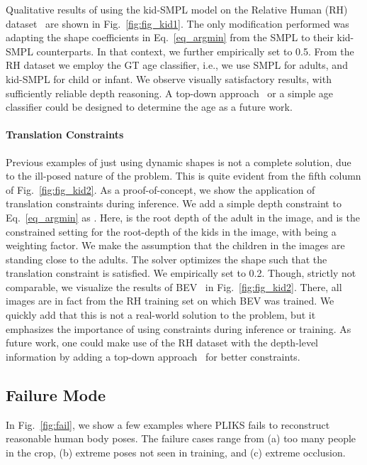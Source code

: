 \documentclass[10pt,twocolumn,letterpaper]{article}
\begin{document}
Qualitative results of using the kid-SMPL model on the Relative Human (RH) dataset~\cite{bev} are shown in Fig.~\ref{fig:fig_kid1}. The only modification performed was adapting the shape coefficients  in Eq.~\ref{eq_argmin} from the SMPL to their kid-SMPL counterparts. In that context, we further empirically set  to 0.5. From the RH dataset we employ the GT age classifier, i.e., we use SMPL for adults, and kid-SMPL for child or infant. We observe visually satisfactory results, with sufficiently reliable depth reasoning. A top-down approach~\cite{bev} or a simple age classifier could be designed to determine the age as a future work.

\paragraph{Translation Constraints}
Previous examples of just using dynamic shapes is not a complete solution, due to the ill-posed nature of the problem. This is quite evident from the fifth column of Fig.~\ref{fig:fig_kid2}. As a proof-of-concept, we show the application of translation constraints during inference. We add a simple depth constraint to Eq.~\ref{eq_argmin} as . Here,  is the root depth of the adult in the image, and   is the constrained setting for the root-depth of the kids in the image, with  being a weighting factor. We make the assumption that the children in the images are standing close to the adults. The solver optimizes the shape such that the translation constraint is satisfied. We empirically set  to 0.2. Though, strictly not comparable, we visualize the results of BEV~\cite{bev} in Fig.~\ref{fig:fig_kid2}. There, all images are in fact from the RH training set on which BEV was trained. We quickly add that this is not a real-world solution to the problem, but it emphasizes the importance of using constraints during inference or training. As future work, one could make use of the RH dataset with the depth-level information by adding a top-down approach~\cite{bev} for better constraints.


\subsection{Failure Mode}
In Fig.~\ref{fig:fail}, we show a few examples where
PLIKS fails to reconstruct reasonable human body poses. The failure cases range from (a) too many people in the crop, (b) extreme poses not seen in training, and (c) extreme occlusion.
\end{document}
